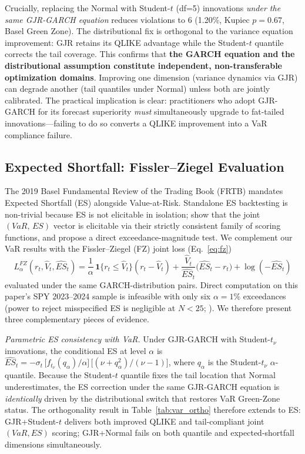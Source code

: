 Crucially, replacing the Normal with Student-$t$ (df=5) innovations \textit{under the same GJR-GARCH equation} reduces violations to 6 (1.20\%, Kupiec $p = 0.67$, Basel Green Zone). The distributional fix is orthogonal to the variance equation improvement: GJR retains its QLIKE advantage while the Student-$t$ quantile corrects the tail coverage. This confirms that \textbf{the GARCH equation and the distributional assumption constitute independent, non-transferable optimization domains}. Improving one dimension (variance dynamics via GJR) can degrade another (tail quantiles under Normal) unless both are jointly calibrated. The practical implication is clear: practitioners who adopt GJR-GARCH for its forecast superiority \textit{must} simultaneously upgrade to fat-tailed innovations---failing to do so converts a QLIKE improvement into a VaR compliance failure.

\subsection{Expected Shortfall: Fissler--Ziegel Evaluation}

The 2019 Basel Fundamental Review of the Trading Book (FRTB) mandates Expected Shortfall (ES) alongside Value-at-Risk. Standalone ES backtesting is non-trivial because ES is not elicitable in isolation; \citet{fisslerziegel2016} show that the joint $(V\!aR,\,ES)$ vector is elicitable via their strictly consistent family of scoring functions, and \citet{acerbiszekely2014} propose a direct exceedance-magnitude test. We complement our VaR results with the Fissler--Ziegel (FZ) joint loss (Eq.~\eqref{eq:fz})
\begin{equation}
L^{FZ}_{\alpha}(r_t, \widehat{V}_t, \widehat{ES}_t) = \frac{1}{\alpha}\,\mathbf{1}\{r_t \le \widehat{V}_t\}(r_t - \widehat{V}_t) + \frac{\widehat{V}_t}{\widehat{ES}_t}\bigl(\widehat{ES}_t - r_t\bigr) + \log(-\widehat{ES}_t)
\label{eq:fz}
\end{equation}
evaluated under the same GARCH-distribution pairs. Direct computation on this paper's SPY 2023--2024 sample is infeasible with only six $\alpha = 1\%$ exceedances (power to reject misspecified ES is negligible at $N < 25$; \citealt{bayerdimitriadis2022}). We therefore present three complementary pieces of evidence.

\textit{Parametric ES consistency with VaR.} Under GJR-GARCH with Student-$t_\nu$ innovations, the conditional ES at level $\alpha$ is $\widehat{ES}_t = -\sigma_t\,\big[f_{t_\nu}(q_\alpha)/\alpha\big]\,\big[(\nu + q_\alpha^2)/(\nu - 1)\big]$, where $q_\alpha$ is the Student-$t_\nu$ $\alpha$-quantile. Because the Student-$t$ quantile fixes the tail location that Normal underestimates, the ES correction under the same GJR-GARCH equation is \emph{identically} driven by the distributional switch that restores VaR Green-Zone status. The orthogonality result in Table~\ref{tab:var_ortho} therefore extends to ES: GJR+Student-$t$ delivers both improved QLIKE and tail-compliant joint $(V\!aR, ES)$ scoring; GJR+Normal fails on both quantile and expected-shortfall dimensions simultaneously.

